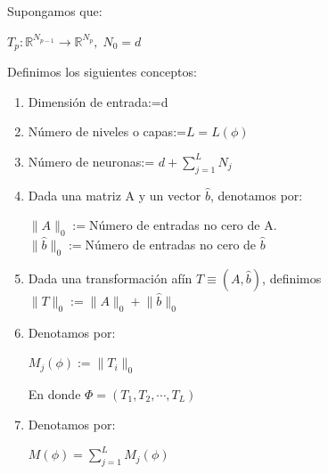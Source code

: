 \documentclass[12pt,a4paper]{book}
\providecommand{\norm}[1]{\lVert#1\rVert}
\begin{document}
\begin{definicion}{}{}
Supongamos que:
\begin{center}
$T_{p}:\mathbb{R}^{N_{p-1}}\rightarrow\mathbb{R}^{N_{p}},\; N_{0}=d$
\end{center}
Definimos los siguientes conceptos:
\begin{enumerate}
\item Dimensión de entrada:=d
\item Número de niveles o capas:=$L=L(\phi)$
\item Número de neuronas:= $d+\sum_{j=1}^{L}N_{j}$
\item Dada una matriz A y un vector $\widehat{b}$, denotamos por:
\begin{center}
$\norm{A}_{0}:=$Número de entradas no cero de A.\\
$\norm{\widehat{b}}_{0}:=$Número de entradas no cero de $\widehat{b}$
\end{center}
\item Dada una transformación afín $T\equiv (A,\widehat{b})$, definimos $\norm{T}_{0}:=\norm{A}_{0}+\norm{\widehat{b}}_{0}$
\item Denotamos por:
\begin{center}
$M_{j}(\phi):=\norm{T_{i}}_{0}$
\end{center}
En donde $\Phi=(T_{1},T_{2},\cdots,T_{L})$
\item Denotamos por:
\begin{center}
$M(\phi)=\sum_{j=1}^{L}M_{j}(\phi)$
\end{center}
\end{enumerate}
\end{definicion}
\end{document}
